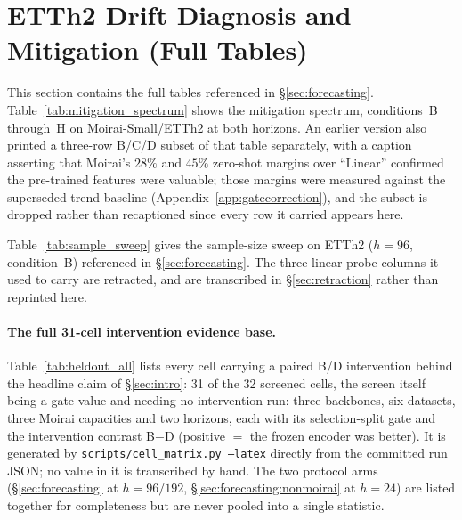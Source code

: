 \section{ETTh2 Drift Diagnosis and Mitigation (Full Tables)}
\label{app:full_tables}

This section contains the full tables referenced in \S\ref{sec:forecasting}.
Table~\ref{tab:mitigation_spectrum} shows the mitigation spectrum, conditions~B
through~H on Moirai-Small/ETTh2 at both horizons. An earlier version also
printed a three-row B/C/D subset of that table separately, with a caption
asserting that Moirai's $28\%$ and $45\%$ zero-shot margins over ``Linear''
confirmed the pre-trained features were valuable; those margins were measured
against the superseded trend baseline (Appendix~\ref{app:gatecorrection}), and
the subset is dropped rather than recaptioned since every row it carried
appears here.



Table~\ref{tab:sample_sweep} gives the sample-size sweep on ETTh2
($h{=}96$, condition~B) referenced in \S\ref{sec:forecasting}.  The three
linear-probe columns it used to carry are retracted, and are transcribed in
\S\ref{sec:retraction} rather than reprinted here.



\paragraph{The full 31-cell intervention evidence base.}
Table~\ref{tab:heldout_all} lists every cell carrying a paired B/D
intervention behind the headline claim of \S\ref{sec:intro}: 31 of the 32
screened cells, the screen itself being a gate value and needing no
intervention run: three backbones, six datasets, three Moirai capacities and
two horizons, each with its selection-split gate and the intervention contrast
B$-$D (positive ${=}$ the frozen encoder was better). It is generated by
\texttt{scripts/cell\_matrix.py --latex} directly from the committed run
JSON; no value in it is transcribed by hand. The two protocol arms
(\S\ref{sec:forecasting} at $h{=}96/192$, \S\ref{sec:forecasting:nonmoirai}
at $h{=}24$) are listed together for completeness but are never pooled into a
single statistic.

